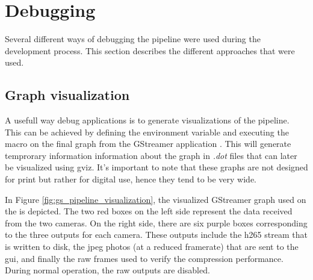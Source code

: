\section{Debugging}
Several different ways of debugging the \gs pipeline were used during the development process.
This section describes the different approaches that were used.

\subsection{Graph visualization}
A usefull way debug \gs applications is to generate visualizations of the pipeline.
This can be achieved by defining the environment variable  and executing the  macro on the final graph from the GStreamer application
\cite{johnstonGeneratingGStreamerPipeline2018}.
This will generate temprorary information information about the graph in \textit{.dot} files that can later be visualized using \gls{gviz}.
It's important to note that these graphs are not designed for print but rather for digital use, hence they tend to be very wide.

In Figure \ref{fig:gs_pipeline_visualization}, the visualized GStreamer graph used on the \sr is depicted.
The two red boxes on the left side represent the data received from the two cameras.
On the right side, there are six purple boxes corresponding to the three outputs for each camera.
These outputs include the \gls{h265} stream that is written to disk, the \gls{jpeg} photos (at a reduced framerate) that are sent to the \gls{gui}, and finally the raw frames used to verify the compression performance.
During normal operation, the raw outputs are disabled.

